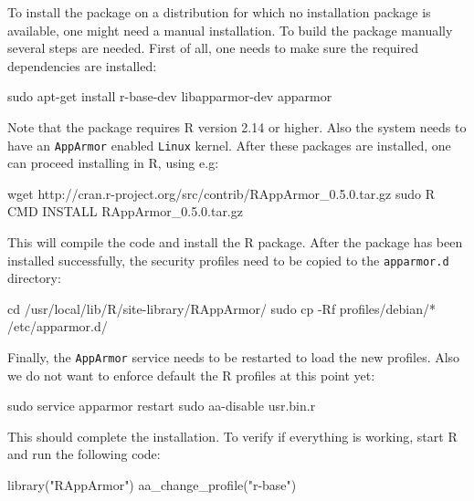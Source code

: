 \documentclass[article]{jss}
\newcommand{\R}{\textsf{R}\xspace}
\newcommand{\AppArmor}{\texttt{AppArmor}\xspace}
\newcommand{\RAppArmor}{\pkg{RAppArmor}\xspace}
\newcommand{\Linux}{\texttt{Linux}\xspace}
\begin{document}
To install the package on a distribution for which no installation package is
available, one might need a manual installation. To build the package manually
several steps are needed. First of all, one needs to make sure the required
dependencies are installed:

\begin{CodeChunk}
\begin{CodeInput}
sudo apt-get install r-base-dev libapparmor-dev apparmor
\end{CodeInput}
\end{CodeChunk}

Note that the package requires \R version 2.14 or higher. Also the
system needs to have an \AppArmor enabled \Linux kernel. After these packages
are installed, one can proceed installing \RAppArmor in \R, using
e.g:

\begin{CodeChunk}
\begin{CodeInput}
wget http://cran.r-project.org/src/contrib/RAppArmor_0.5.0.tar.gz
sudo R CMD INSTALL RAppArmor_0.5.0.tar.gz
\end{CodeInput}
\end{CodeChunk}

This will compile the  code and install the \R
package. After the package has been installed successfully, the security
profiles need to be copied to the \texttt{apparmor.d} directory:

\begin{CodeChunk}
\begin{CodeInput}
cd /usr/local/lib/R/site-library/RAppArmor/
sudo cp -Rf profiles/debian/* /etc/apparmor.d/
\end{CodeInput}
\end{CodeChunk}

Finally, the \AppArmor service needs to be restarted to load the new profiles.
Also we do not want to enforce default the \R profiles at this point yet:

\begin{CodeChunk}
\begin{CodeInput}
sudo service apparmor restart
sudo aa-disable usr.bin.r
\end{CodeInput}
\end{CodeChunk}

This should complete the installation. To verify if everything is working, start
\R and run the following code:

\begin{CodeChunk}
\begin{CodeInput}
library("RAppArmor")
aa_change_profile("r-base")
\end{CodeInput}
\end{CodeChunk}
\end{document}
